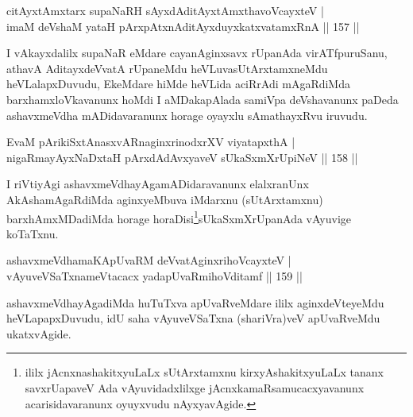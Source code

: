 
\begin{shl}
citAyxtAmx\s tarx supaNaRH sAyxdAditAyxtAmx\s thavoVcayxteV |\\
imaM deVshaM yataH pArxpAtxnAditAyxduyxkatxvatamxRnA \hfill || 157 ||
\end{shl}

\begin{artha}
I vAkayxdalilx supaNaR eMdare cayanAginxsavx rUpanAda virATfpuruSanu, athavA AditayxdeVvatA rUpaneMdu heVLuvasUtArxtamxneMdu heVLalapxDuvudu, EkeMdare hiMde heVLida aciRrAdi mAgaRdiMda barxhamxloVkavanunx hoMdi I aMDakapAlada samiVpa deVshavanunx paDeda ashavxmeVdha mADidavaranunx horage oyayxlu sAmathayxRvu iruvudu.
\end{artha}

\begin{shl}
\footnotemark{}EvaM pArikiSxtAnasxvARnaginxrinodxrXV viyatapxthA |\\
nigaRmayAyxNaDxtaH pArxdAdAvxyaveV sUkaSxmXrUpiNeV \hfill || 158 ||
\end{shl}

\begin{artha}
I riVtiyAgi ashavxmeVdhayAgamADidaravanunx elalxranUnx AkAshamAgaRdiMda aginxyeMbuva iMdarxnu (sUtArxtamxnu) barxhAmxMDadiMda horage horaDisi\footnote{ililx jAcnxnashakitxyuLaLx sUtArxtamxnu kirxyAshakitxyuLaLx tananx savxrUapaveV Ada vAyuvidadxlilxge jAcnxkamaRsamucacxyavanunx acarisidavaranunx oyuyxvudu nAyxyavAgide.}sUkaSxmXrUpanAda vAyuvige koTaTxnu.
\end{artha}


\begin{shl}
ashavxmeVdhamaKApUvaRM deVvatA\s ginxrihoVcayxteV |\\
vAyuveVSaTxnameVtacacx yadapUvaRmihoVditamf \hfill || 159 ||
\end{shl}

\begin{artha}
ashavxmeVdhayAgadiMda huTuTxva apUvaRveMdare ililx aginxdeVteyeMdu heVLapapxDuvudu, idU saha vAyuveVSaTxna (shariVra)veV apUvaRveMdu ukatxvAgide.
\end{artha}

